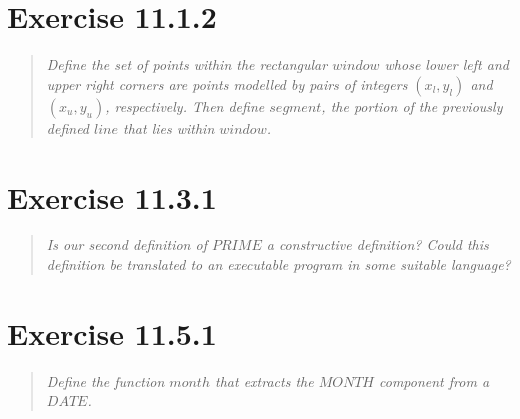 \documentclass[10pt]{article}
\begin{document}
\section{Exercise 11.1.2}
\begin{quote}
  {\it Define the set of points within the rectangular $window$ whose lower left and upper right
    corners are points modelled by pairs of integers $(x_l, y_l)$ and $(x_u, y_u)$, respectively.
    Then define $segment$, the portion of the previously defined $line$ that lies within $window$. }
\end{quote}


\section{Exercise 11.3.1}
\begin{quote}
  {\it Is our second definition of $PRIME$ a constructive definition?  Could this definition be
    translated to an executable program in some suitable language? }
\end{quote}


\section{Exercise 11.5.1}
\begin{quote}
  {\it Define the function $month$ that extracts the $MONTH$ component from a $DATE$. }
\end{quote}
\end{document}
